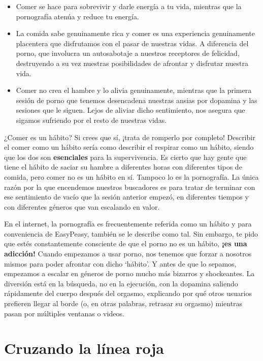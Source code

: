 \documentclass[
  spanish,
  openany]{book}
\providecommand{\tightlist}{%
  \setlength{\itemsep}{0pt}\setlength{\parskip}{0pt}}
\begin{document}
\begin{itemize}
\tightlist
\item
  Comer se hace para sobrevivir y darle energía a tu vida, mientras que la pornografía atenúa y reduce tu energía.
\item
  La comida sabe genuinamente rica y comer es una experiencia genuinamente placentera que disfrutamos con el pasar de nuestras vidas. A diferencia del porno, que involucra un autosabotaje a nuestros receptores de felicidad, destruyendo a su vez nuestras posibilidades de afrontar y disfrutar nuestra vida.
\item
  Comer no crea el hambre y lo alivia genuinamente, mientras que la primera sesión de porno que tenemos desencadena nuestras ansias por dopamina y las sesiones que le siguen. Lejos de aliviar dicho sentimiento, nos asegura que sigamos sufriendo por el resto de nuestras vidas.
\end{itemize}

¿Comer es un hábito? Si crees que sí, ¡trata de romperlo por completo! Describir el comer como un hábito sería como describir el respirar como un hábito, siendo que los dos son \textbf{esenciales} para la supervivencia. Es cierto que hay gente que tiene el hábito de saciar su hambre a diferentes horas con diferentes tipos de comida, pero comer no es un hábito en sí. Tampoco lo es la pornografía. La única razón por la que encendemos nuestros buscadores es para tratar de terminar con ese sentimiento de vacío que la sesión anterior empezó, en diferentes tiempos y con diferentes géneros que van escalando en valor.

En el internet, la pornografía es frecuentemente referida como un hábito y para conveniencia de EasyPeasy, también se le describe como tal. Sin embargo, te pido que estés constantemente consciente de que el porno no es un hábito, \textbf{¡es una adicción!} Cuando empezamos a usar porno, nos tenemos que forzar a nosotros mismos para poder afrontar con dicho `hábito'. Y antes de que lo sepamos, empezamos a escalar en géneros de porno mucho más bizarros y shockeantes. La diversión está en la búsqueda, no en la ejecución, con la dopamina saliendo rápidamente del cuerpo después del orgasmo, explicando por qué otros usuarios prefieren llegar al borde (o, en otras palabras, retrasar su orgasmo) mientras pasan por múltiples ventanas o videos.

\hypertarget{cruzando-la-luxednea-roja}{%
\section{Cruzando la línea roja}\label{cruzando-la-luxednea-roja}}
\end{document}
